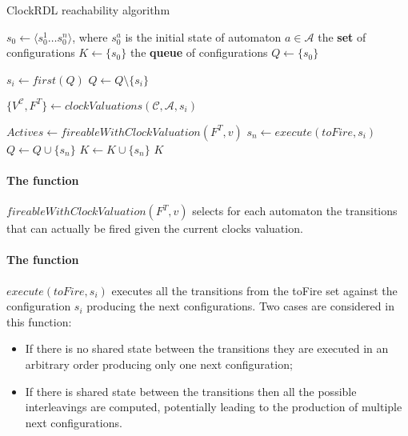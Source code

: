 \documentclass[11pt, oneside]{article}   	%
\begin{document}
\begin{algorithm}
\caption{ClockRDL reachability algorithm}
\label{alg:reachability}
\begin{algorithmic}
  \State $s_0 \gets \langle s_0^1 \ldots s_0^n \rangle$, where $s_0^a$ is the initial state of automaton $a \in \mathcal{A}$ 
   the {\bf set} of configurations $K\gets \{s_0\}$
   the {\bf queue} of configurations $Q\gets \{s_0\}$

     $s_i \gets first(Q)$
    \State $Q \gets Q \setminus \{s_i\}$

    \State $\{V^\mathcal{C}, F^T\} \gets clockValuations(\mathcal{C}, \mathcal{A}, s_i)$

      \State $Actives \gets fireableWithClockValuation(F^T, v)$
        \State $s_n \gets execute(toFire, s_i)$
          \State $Q\gets Q \cup \{s_n\}$
          \State $K \gets K \cup \{s_n\}$
        \EndIf
      \EndFor
    \EndFor
  \EndWhile
\State\Return $K$
\EndFunction
\end{algorithmic}
\end{algorithm}

\paragraph{The function} $fireableWithClockValuation(F^T, v)$ selects for each automaton the transitions that can actually be fired given the current clocks valuation.

\paragraph{The function} $execute(toFire, s_i)$ executes all the transitions from the toFire set against the configuration $s_i$ producing the next configurations. Two cases are considered in this function: 
\begin{itemize}
\item If there is no shared state between the transitions they are executed in an arbitrary order producing only one next configuration;
\item If there is shared state between the transitions then all the possible interleavings are computed, potentially leading to the production of multiple next configurations.
\end{itemize}
\end{document}
